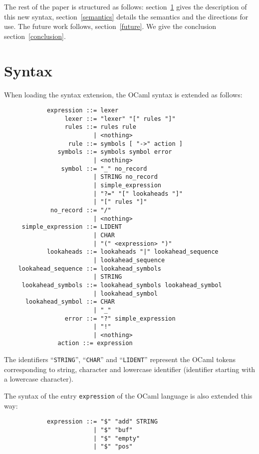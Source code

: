 \documentclass[11pt]{article}
\begin{document}
The rest of the paper is structured as follows: section~\ref{syntax}
gives the description of this new syntax, section~\ref{semantics}
details the semantics and the directions for use. The future work
follows, section~\ref{future}. We give the conclusion
section~\ref{conclusion}.

\section{Syntax}
\label{syntax}

When loading the syntax extension, the OCaml syntax is extended as
follows:

\begin{verbatim}
            expression ::= lexer
                 lexer ::= "lexer" "[" rules "]"
                 rules ::= rules rule
                         | <nothing>
                  rule ::= symbols [ "->" action ]
               symbols ::= symbols symbol error
                         | <nothing>
                symbol ::= "_" no_record
                         | STRING no_record
                         | simple_expression
                         | "?=" "[" lookaheads "]"
                         | "[" rules "]"
             no_record ::= "/"
                         | <nothing>
     simple_expression ::= LIDENT
                         | CHAR
                         | "(" <expression> ")"
            lookaheads ::= lookaheads "|" lookahead_sequence
                         | lookahead_sequence
    lookahead_sequence ::= lookahead_symbols
                         | STRING
     lookahead_symbols ::= lookahead_symbols lookahead_symbol
                         | lookahead_symbol
      lookahead_symbol ::= CHAR
                         | "_"
                 error ::= "?" simple_expression
                         | "!"
                         | <nothing>
               action ::= expression
\end{verbatim}

The identifiers ``\verb/STRING/'', ``\verb/CHAR/'' and
``\verb/LIDENT/'' represent the OCaml tokens corresponding to string,
character and lowercase identifier (identifier starting with a
lowercase character).

The syntax of the entry \verb/expression/ of the OCaml language
is also extended this way:

\begin{verbatim}
            expression ::= "$" "add" STRING
                         | "$" "buf"
                         | "$" "empty"
                         | "$" "pos"
\end{verbatim}
\end{document}
